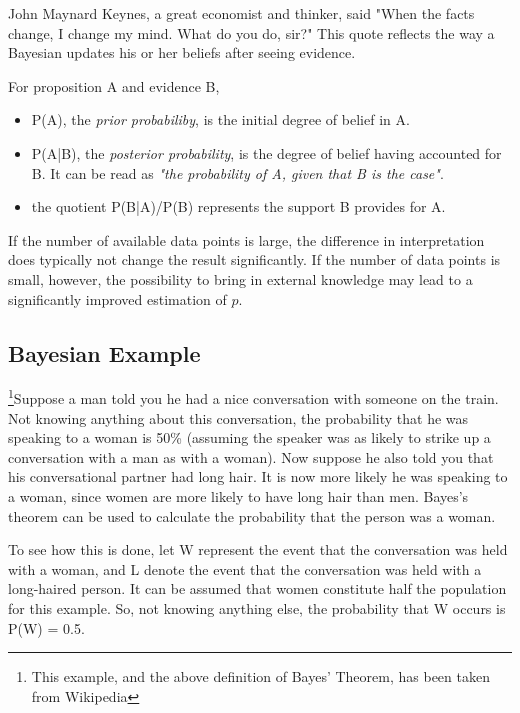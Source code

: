 John Maynard Keynes, a great economist and thinker, said "When the facts change, I change my mind. What do you do, sir?" This quote reflects the way a Bayesian updates his or her beliefs after seeing evidence.

For proposition A and evidence B,

\begin{itemize}
  \item P(A), the \emph{prior probabiliby}, is the initial degree of belief in A.
  \item P(A|B), the \emph{posterior probability}, is the degree of belief having accounted for B. It can be read as \emph{"the probability of A, given that B is the case"}.
  \item the quotient P(B|A)/P(B) represents the support B provides for A.
\end{itemize}

If the number of available data points is large, the difference in interpretation does typically not change the result significantly. If the number of data points is small, however, the possibility to bring in external knowledge may lead to a significantly improved estimation of $p$.

\subsection{Bayesian Example}

\footnote{This example, and the above definition of Bayes' Theorem, has been taken from Wikipedia}Suppose a man told you he had a nice conversation with someone on the train. Not knowing anything about this conversation, the probability that he was speaking to a woman is 50\% (assuming the speaker was as likely to strike up a conversation with a man as with a woman). Now suppose he also told you that his conversational partner had long hair. It is now more likely he was speaking to a woman, since women are more likely to have long hair than men. Bayes's theorem can be used to calculate the probability that the person was a woman.

To see how this is done, let W represent the event that the conversation was held with a woman, and L denote the event that the conversation was held with a long-haired person. It can be assumed that women constitute half the population for this example. So, not knowing anything else, the probability that W occurs is P(W) = 0.5.

